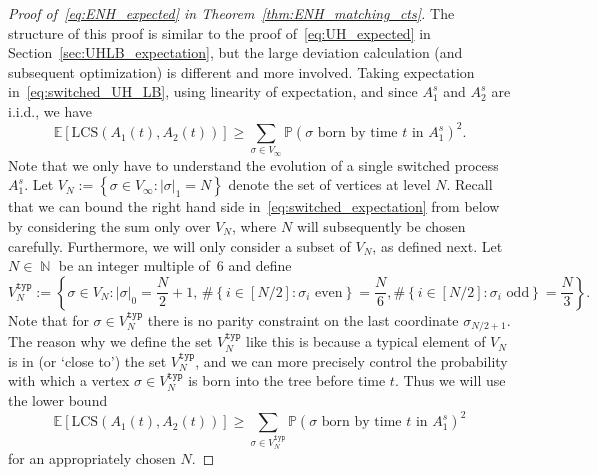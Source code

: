 \documentclass[11pt]{article}
\numberwithin{equation}{section}
\DeclareMathOperator{\N}{\mathbb{N}} %
\newcommand{\p}{\mathbb{P}} %
\newcommand{\E}{\mathbb{E}} %
\newcommand{\LCS}{\mathrm{LCS}} %
\theoremstyle{definition}
\begin{document}
\begin{proof}[Proof of~\eqref{eq:ENH_expected} in Theorem~\ref{thm:ENH_matching_cts}] 
The structure of this proof is similar to the proof of~\eqref{eq:UH_expected} in Section~\ref{sec:UHLB_expectation}, 
but the large deviation calculation (and subsequent optimization) is different and more involved. 
Taking expectation in~\eqref{eq:switched_UH_LB}, using linearity of expectation, and since $A_{1}^{s}$ and $A_{2}^{s}$ are i.i.d., 
we have
\begin{equation}\label{eq:switched_expectation}
\E \left[ \LCS(A_{1}(t), A_{2}(t)) \right] 
\geq \sum_{\sigma \in V_{\infty}} \p \left( \sigma \text{ born by time } t \text{ in } A_{1}^{s} \right)^{2}.
\end{equation}
Note that we only have to understand the evolution of a single switched process $A_{1}^{s}$. Let $V_{N} := \left\{ \sigma \in V_{\infty} : |\sigma|_{1} = N \right\}$ denote the set of vertices at level $N$. 
Recall that we can bound the right hand side in~\eqref{eq:switched_expectation} from below by considering the sum only over $V_{N}$, where $N$ will subsequently be chosen carefully. 
Furthermore, we will only consider a subset of $V_{N}$, as defined next. 
Let $N \in \N$ be an integer multiple of~$6$ and define 
\begin{equation} \label{eq:VNtyp}
    V_N^{\mathtt{typ}} := 
    \left\{ \sigma\in V_N:  |\sigma|_0 =  \frac{N}{2} + 1 , 
     \,\#\left\{ i \in \left[N/2\right]  : \sigma_i \text{ even} \right\}=  \frac{N}{6} ,
     \#\left\{ i \in \left[N/2\right]  : \sigma_i \text{ odd} \right\}=   \frac{N}{3} 
    \right\}.
\end{equation}
Note that for $\sigma \in V_N^{\mathtt{typ}}$ there is no parity constraint on the last coordinate $\sigma_{N/2 +1}$. 
The reason why we define the set $V_N^{\mathtt{typ}}$ like this is because a typical element of $V_N$ is in (or `close to') the set $V_N^{\mathtt{typ}}$, and we can more precisely control the probability with which a vertex $\sigma\in V_N^{\mathtt{typ}}$ is born into the tree before time $t$. Thus we will use the lower bound 
\begin{equation}\label{eq:switched_expectation_LB}
\E \left[ \LCS(A_{1}(t), A_{2}(t)) \right] 
\geq \sum_{\sigma \in V_N^{\mathtt{typ}}} \p \left( \sigma \text{ born by time } t \text{ in } A_{1}^{s} \right)^{2}
\end{equation}
for an appropriately chosen $N$.




\end{proof}
\end{document}
